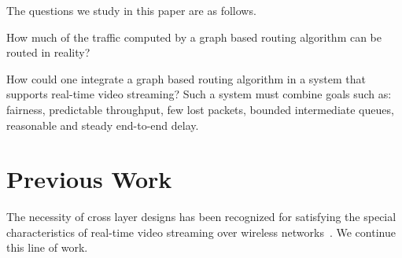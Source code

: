 \documentclass[12pt,oneside,english,a4paper]{book}
\theoremstyle{plain}
\theoremstyle{definition}
\theoremstyle{Theorem}
\theoremstyle{plain}
\newenvironment{proof sketch}[1]{\noindent {\emph{Proof sketch of #1:}}}{\hfill \qed}
\newcommand{\SNR}{\text{\sc{snr}}}
\newcommand{\MCS}{\text{\sc{mcs}}}
\begin{document}
The questions we study in this paper are as follows.
\begin{inparaenum}[(i)]
\item How much of the traffic computed by a graph based routing
  algorithm can be routed in reality?
\item How could one integrate a graph based routing algorithm in a
  system that supports real-time video streaming? Such a system must
  combine goals such as: fairness, predictable throughput, few lost
  packets, bounded intermediate queues, reasonable and steady
  end-to-end delay.
\end{inparaenum}

\section{Previous Work}
The necessity of cross layer designs has been recognized for
satisfying the special characteristics of real-time video streaming
over wireless
networks~\cite{shan2005cross,setton2005cross,khan2006application}.  We
continue this line of work.

\end{document}
